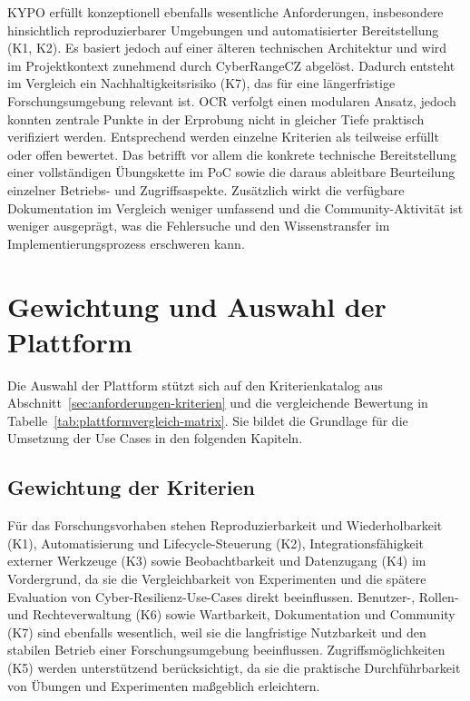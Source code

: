 KYPO erfüllt konzeptionell ebenfalls wesentliche Anforderungen, insbesondere hinsichtlich
reproduzierbarer Umgebungen und automatisierter Bereitstellung (K1, K2). Es basiert jedoch auf einer
älteren technischen Architektur und wird im Projektkontext zunehmend durch CyberRangeCZ abgelöst.
Dadurch entsteht im Vergleich ein Nachhaltigkeitsrisiko (K7), das für eine längerfristige
Forschungsumgebung relevant ist. OCR verfolgt einen modularen Ansatz, jedoch
konnten zentrale Punkte in der Erprobung nicht in gleicher Tiefe praktisch verifiziert werden.
Entsprechend werden einzelne Kriterien als teilweise erfüllt oder offen bewertet. Das betrifft vor
allem die konkrete technische Bereitstellung einer vollständigen Übungskette im PoC sowie die daraus
ableitbare Beurteilung einzelner Betriebs- und Zugriffsaspekte. Zusätzlich wirkt die verfügbare
Dokumentation im Vergleich weniger umfassend und die Community-Aktivität ist weniger ausgeprägt, was
die Fehlersuche und den Wissenstransfer im Implementierungsprozess erschweren kann.

\section{Gewichtung und Auswahl der Plattform}
\label{sec:gewichtung-auswahl}

Die Auswahl der Plattform stützt sich auf den Kriterienkatalog aus
Abschnitt~\ref{sec:anforderungen-kriterien} und die vergleichende Bewertung in
Tabelle~\ref{tab:plattformvergleich-matrix}. Sie bildet die Grundlage für die Umsetzung der Use
Cases in den folgenden Kapiteln.

\subsection{Gewichtung der Kriterien}
\label{subsec:gewichtung}

Für das Forschungsvorhaben stehen Reproduzierbarkeit und Wiederholbarkeit (K1), Automatisierung und
Lifecycle-Steuerung (K2), Integrationsfähigkeit externer Werkzeuge (K3) sowie Beobachtbarkeit und
Datenzugang (K4) im Vordergrund, da sie die Vergleichbarkeit von Experimenten und die spätere
Evaluation von Cyber-Resilienz-Use-Cases direkt beeinflussen. Benutzer-, Rollen- und
Rechteverwaltung (K6) sowie Wartbarkeit, Dokumentation und Community (K7) sind ebenfalls wesentlich,
weil sie die langfristige Nutzbarkeit und den stabilen Betrieb einer Forschungsumgebung
beeinflussen. Zugriffsmöglichkeiten (K5) werden unterstützend berücksichtigt, da sie die praktische
Durchführbarkeit von Übungen und Experimenten maßgeblich erleichtern.

